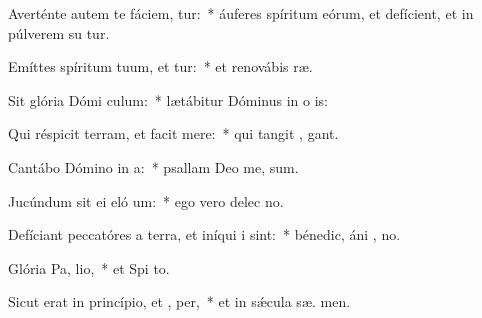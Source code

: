\item Averténte autem te fáciem, tur:~* áuferes spíritum eórum, et defícient, et in púlverem su tur.
\item Emíttes spíritum tuum, et tur:~* et renovábis  ræ.
\item Sit glória Dómi  culum:~* lætábitur Dóminus in o is:
\item Qui réspicit terram, et facit  mere:~* qui tangit ,  gant.
\item Cantábo Dómino in  a:~* psallam Deo me,  sum.
\item Jucúndum sit ei eló um:~* ego vero delec  no.
\item Defíciant peccatóres a terra, et iníqui i   sint:~* bénedic, áni , no.
\item Glória Pa,  lio,~* et Spi to.
\item Sicut erat in princípio, et ,  per,~* et in sǽcula sæ. men.
